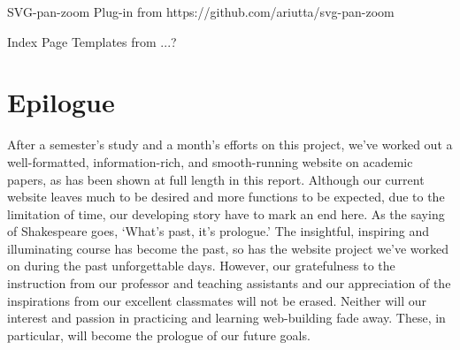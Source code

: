 \documentclass{book}
\begin{document}
SVG-pan-zoom Plug-in from  https://github.com/ariutta/svg-pan-zoom

Index Page Templates from ...?




\chapter{Epilogue}
After a semester's study and a month's efforts on this project, we've worked out a well-formatted, information-rich, and smooth-running website on academic papers, as has been shown at full length in this report. Although our current website leaves much to be desired and more functions to be expected, due to the limitation of time, our developing story have to mark an end here. As the saying of Shakespeare goes, ‘What’s past, it’s prologue.’ The insightful, inspiring and illuminating course has become the past, so has the website project we’ve worked on during the past unforgettable days. However, our gratefulness to the instruction from our professor and teaching assistants and our appreciation of the inspirations from our excellent classmates will not be erased. Neither will our interest and passion in practicing and learning web-building fade away. These, in particular, will become the prologue of our future goals.
\end{document}
